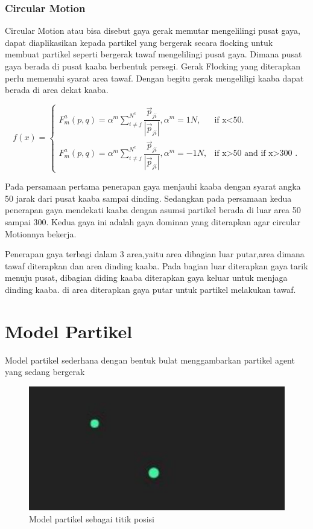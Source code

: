 \subsubsection{Circular Motion}\label{sec:circularmotion}
\hspace{0.5cm}Circular Motion atau bisa disebut gaya gerak memutar mengelilingi pusat gaya, dapat diaplikasikan kepada partikel yang bergerak secara flocking untuk membuat partikel seperti bergerak tawaf mengelilingi pusat gaya. Dimana pusat gaya berada di pusat kaaba berbentuk persegi. Gerak Flocking yang diterapkan perlu memenuhi syarat area tawaf. Dengan begitu gerak mengeliligi kaaba dapat berada di area dekat kaaba.

\[
  f(x)=\begin{cases}
    F_m^a(p,q) = \alpha^m \sum^{N^c}_{i \neq j}\dfrac{\vec{p}_{ji}}{|\vec{p}_{ji}|},\alpha^m = 1N , & \text{if x<50}.\\
    F_m^a(p,q) = \alpha^m \sum^{N^c}_{i \neq j}\dfrac{\vec{p}_{ji}}{|\vec{p}_{ji}|},\alpha^m = -1N, & \text{if x>50 and if x>300 }.
  \end{cases}
\]

\hspace{0.5cm}Pada persamaan pertama penerapan gaya menjauhi kaaba dengan syarat angka 50 jarak dari pusat kaaba sampai dinding. Sedangkan pada persamaan kedua penerapan gaya mendekati kaaba dengan asumsi partikel berada di luar area 50 sampai 300. Kedua gaya ini adalah gaya dominan yang diterapkan agar circular Motionnya bekerja.


\hspace{0.5cm}Penerapan gaya terbagi dalam 3 area,yaitu area dibagian luar putar,area dimana tawaf diterapkan dan area dinding kaaba. Pada bagian luar diterapkan gaya tarik menuju pusat, dibagian diding kaaba diterapkan gaya keluar untuk menjaga dinding kaaba. di area diterapkan gaya putar untuk partikel melakukan tawaf.



\section{Model Partikel}\label{sec:modelpartikel}
\hspace {0.5cm}Model partikel sederhana dengan bentuk bulat menggambarkan partikel agent yang sedang bergerak
\begin{figure}
\centering
\includegraphics[scale=0.3]{gambar/ModelPartikel.JPG}
\caption{Model partikel sebagai titik posisi}
\end{figure}


